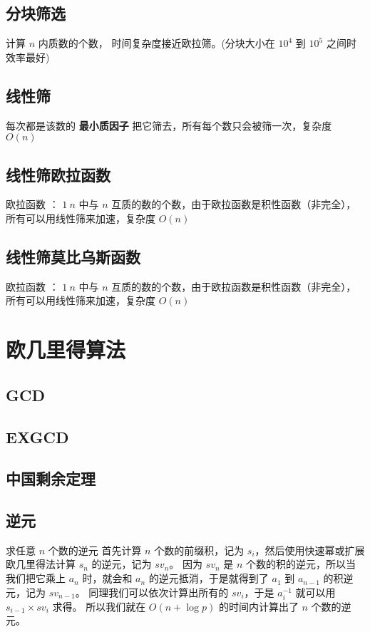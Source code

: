 \documentclass{probook}
\begin{document}
\subsection{分块筛选}
计算 $n$ 内质数的个数， 时间复杂度接近欧拉筛。(分块大小在 $10 ^ 4$ 到 $10 ^ 5$ 之间时效率最好)

\subsection{线性筛}
每次都是该数的 \textbf{最小质因子} 把它筛去，所有每个数只会被筛一次，复杂度 $O(n)$

\subsection{线性筛欧拉函数}
欧拉函数 ： $1 ~ n$ 中与 $n$ 互质的数的个数，由于欧拉函数是积性函数（非完全），所有可以用线性筛来加速，复杂度 $O(n)$

\subsection{线性筛莫比乌斯函数}
欧拉函数 ： $1 ~ n$ 中与 $n$ 互质的数的个数，由于欧拉函数是积性函数（非完全），所有可以用线性筛来加速，复杂度 $O(n)$

\section{欧几里得算法}
\subsection{GCD}

\subsection{EXGCD} 

\subsection{中国剩余定理}

\subsection{逆元} 
求任意 $n$ 个数的逆元
首先计算 $n$ 个数的前缀积，记为 $s_i$，然后使用快速幂或扩展欧几里得法计算 $s_n$ 的逆元，记为 $sv_n$。
因为 $sv_n$ 是 $n$ 个数的积的逆元，所以当我们把它乘上 $a_n$ 时，就会和 $a_n$ 的逆元抵消，于是就得到了 $a_1$ 到 $a_{n-1}$ 的积逆元，记为 $sv_{n-1}$。
同理我们可以依次计算出所有的 $sv_i$，于是 $a_i^{-1}$ 就可以用 $s_{i-1} \times sv_i$ 求得。
所以我们就在 $O(n + \log p)$ 的时间内计算出了 $n$ 个数的逆元。

\end{document}
